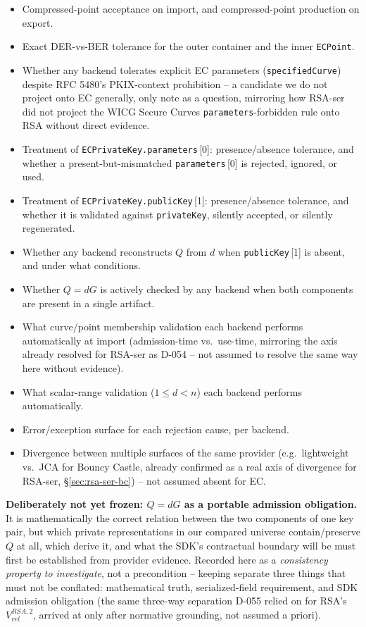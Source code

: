 \documentclass[11pt,a4paper]{article}
\begin{document}
\begin{itemize}
\item Compressed-point acceptance on import, and compressed-point production on export.
\item Exact DER-vs-BER tolerance for the outer container and the inner \texttt{ECPoint}.
\item Whether any backend tolerates explicit EC parameters (\texttt{specifiedCurve}) despite RFC 5480's PKIX-context prohibition -- a candidate we do not project onto EC generally, only note as a question, mirroring how RSA-ser did not project the WICG Secure Curves \texttt{parameters}-forbidden rule onto RSA without direct evidence.
\item Treatment of \texttt{ECPrivateKey.parameters}\,[0]: presence/absence tolerance, and whether a present-but-mismatched \texttt{parameters}\,[0] is rejected, ignored, or used.
\item Treatment of \texttt{ECPrivateKey.publicKey}\,[1]: presence/absence tolerance, and whether it is validated against \texttt{privateKey}, silently accepted, or silently regenerated.
\item Whether any backend reconstructs $Q$ from $d$ when \texttt{publicKey}\,[1] is absent, and under what conditions.
\item Whether $Q=dG$ is actively checked by any backend when both components are present in a single artifact.
\item What curve/point membership validation each backend performs automatically at import (admission-time vs.\ use-time, mirroring the axis already resolved for RSA-ser as D-054 -- not assumed to resolve the same way here without evidence).
\item What scalar-range validation ($1\le d<n$) each backend performs automatically.
\item Error/exception surface for each rejection cause, per backend.
\item Divergence between multiple surfaces of the same provider (e.g.\ lightweight vs.\ JCA for Bouncy Castle, already confirmed as a real axis of divergence for RSA-ser, \S\ref{sec:rsa-ser-bc}) -- not assumed absent for EC.
\end{itemize}

\textbf{Deliberately not yet frozen: $Q=dG$ as a portable admission obligation.} It is mathematically the correct relation between the two components of one key pair, but which private representations in our compared universe contain/preserve $Q$ at all, which derive it, and what the SDK's contractual boundary will be must first be established from provider evidence. Recorded here as a \emph{consistency property to investigate}, not a precondition -- keeping separate three things that must not be conflated: mathematical truth, serialized-field requirement, and SDK admission obligation (the same three-way separation D-055 relied on for RSA's $V_{rel}^{RSA,2}$, arrived at only after normative grounding, not assumed a priori).
\end{document}
